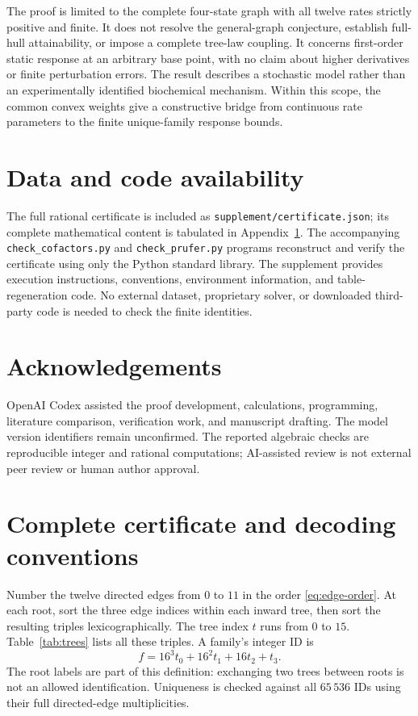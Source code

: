 \documentclass[11pt,a4paper]{article}
\begin{document}
The proof is limited to the complete four-state graph with all twelve
rates strictly positive and finite. It does not resolve the general-graph
conjecture, establish full-hull attainability, or impose a complete
tree-law coupling. It concerns first-order static response at an
arbitrary base point, with no claim about higher derivatives or finite
perturbation errors. The result describes a stochastic model rather
than an experimentally identified biochemical mechanism. Within this
scope, the common convex weights give a constructive bridge from
continuous rate parameters to the finite unique-family response bounds.

\section*{Data and code availability}

The full rational certificate is included as
\texttt{supplement/certificate.json}; its complete mathematical content
is tabulated in Appendix~\ref{app:certificate}. The accompanying
\texttt{check\_cofactors.py} and \texttt{check\_prufer.py} programs
reconstruct and verify the certificate using only the Python standard
library. The supplement provides execution instructions, conventions,
environment information, and table-regeneration code. No external
dataset, proprietary solver, or downloaded third-party code is needed
to check the finite identities.

\section*{Acknowledgements}

OpenAI Codex assisted the proof development, calculations, programming,
literature comparison, verification work, and manuscript drafting.
The model version identifiers remain unconfirmed. The reported
algebraic checks are reproducible integer and rational computations;
AI-assisted review is not external peer review or human author approval.

\clearpage
\appendix
\section{Complete certificate and decoding conventions}
\label{app:certificate}

Number the twelve directed edges from $0$ to $11$ in the order
\eqref{eq:edge-order}. At each root, sort the three edge indices within
each inward tree, then sort the resulting triples lexicographically.
The tree index $t$ runs from $0$ to $15$. Table~\ref{tab:trees} lists
all these triples. A family's integer ID is
\begin{equation}
 f=16^3t_0+16^2t_1+16t_2+t_3.
 \label{eq:family-id}
\end{equation}
The root labels are part of this definition: exchanging two trees
between roots is not an allowed identification. Uniqueness is checked
against all $65\,536$ IDs using their full directed-edge multiplicities.
\end{document}
